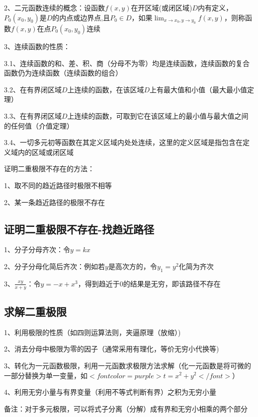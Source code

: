 2、二元函数连续的概念：设函数$ f(x, y) $在开区域(或闭区域)$ D $内有定义，$ P_{0}\left(x_{0}, y_{0}\right) $是$ D $的内点或边界点,且$ P_{0} \in D $，如果$ \lim_{x \rightarrow x_{0},y \rightarrow y_{0}} f(x, y) $，则称函数$ f(x, y) $在点$ P_{0}\left(x_{0}, y_{0}\right) $连续

3、连续函数的性质：

3.1、连续函数的和、差、积、商（分母不为零）均是连续函数，连续函数的复合函数仍为连续函数（连续函数的组合）

3.2、在有界闭区域$ D $上连续的函数，在该区域$ D $上有最大值和小值（最大最小值定理）

3.3、在有界闭区域$ D $上连续的函数，可取到它在该区域上的最小值与最大值之间的任何值（介值定理）

3.4、一切多元初等函数在其定义区域内处处连续，这里的定义区域是指包含在定义域内的区域或闭区域

证明二重极限不存在的方法：

1、取不同的趋近路径时极限不相等

2、某一条趋近路径的极限不存在



\subsection{证明二重极限不存在-找趋近路径}

1、分子分母齐次：令$ y=kx $

2、分子分母化简后齐次：例如若$ y $是高次方的，令$ y_1=y^2 $化简为齐次

3、$ \frac{xy}{x+y} $：令$ y=-x+x^3 $，得到趋近于0的结果是无穷，即该路径不存在



\subsection{求解二重极限}

1、利用极限的性质（如四则运算法则，夹逼原理（放缩）)

2、消去分母中极限为零的因子（通常采用有理化，等价无穷小代换等)

3、转化为一元函数极限，利用一元函数求极限方法求解（化一元函数是将可微的一部分替换为单一变量，如$ <font color=purple>t=x^2+y^2</font> $）

4、利用无穷小量与有界变量（利用不等式判断有界）之积为无穷小量

备注：对于多元极限，可以将式子分离（分解）成有界和无穷小相乘的两个部分

